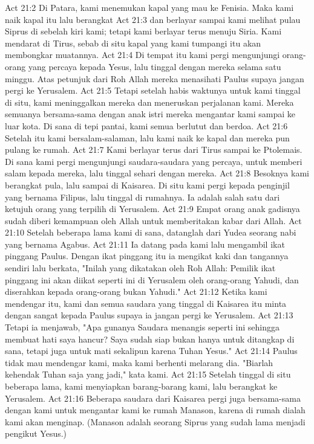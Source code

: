 Act 21:2  Di Patara, kami menemukan kapal yang mau ke Fenisia. Maka kami naik kapal itu lalu berangkat
Act 21:3  dan berlayar sampai kami melihat pulau Siprus di sebelah kiri kami; tetapi kami berlayar terus menuju Siria. Kami mendarat di Tirus, sebab di situ kapal yang kami tumpangi itu akan membongkar muatannya.
Act 21:4  Di tempat itu kami pergi mengunjungi orang-orang yang percaya kepada Yesus, lalu tinggal dengan mereka selama satu minggu. Atas petunjuk dari Roh Allah mereka menasihati Paulus supaya jangan pergi ke Yerusalem.
Act 21:5  Tetapi setelah habis waktunya untuk kami tinggal di situ, kami meninggalkan mereka dan meneruskan perjalanan kami. Mereka semuanya bersama-sama dengan anak istri mereka mengantar kami sampai ke luar kota. Di sana di tepi pantai, kami semua berlutut dan berdoa.
Act 21:6  Setelah itu kami bersalam-salaman, lalu kami naik ke kapal dan mereka pun pulang ke rumah.
Act 21:7  Kami berlayar terus dari Tirus sampai ke Ptolemais. Di sana kami pergi mengunjungi saudara-saudara yang percaya, untuk memberi salam kepada mereka, lalu tinggal sehari dengan mereka.
Act 21:8  Besoknya kami berangkat pula, lalu sampai di Kaisarea. Di situ kami pergi kepada penginjil yang bernama Filipus, lalu tinggal di rumahnya. Ia adalah salah satu dari ketujuh orang yang terpilih di Yerusalem.
Act 21:9  Empat orang anak gadisnya sudah diberi kemampuan oleh Allah untuk memberitakan kabar dari Allah.
Act 21:10  Setelah beberapa lama kami di sana, datanglah dari Yudea seorang nabi yang bernama Agabus.
Act 21:11  Ia datang pada kami lalu mengambil ikat pinggang Paulus. Dengan ikat pinggang itu ia mengikat kaki dan tangannya sendiri lalu berkata, "Inilah yang dikatakan oleh Roh Allah: Pemilik ikat pinggang ini akan diikat seperti ini di Yerusalem oleh orang-orang Yahudi, dan diserahkan kepada orang-orang bukan Yahudi."
Act 21:12  Ketika kami mendengar itu, kami dan semua saudara yang tinggal di Kaisarea itu minta dengan sangat kepada Paulus supaya ia jangan pergi ke Yerusalem.
Act 21:13  Tetapi ia menjawab, "Apa gunanya Saudara menangis seperti ini sehingga membuat hati saya hancur? Saya sudah siap bukan hanya untuk ditangkap di sana, tetapi juga untuk mati sekalipun karena Tuhan Yesus."
Act 21:14  Paulus tidak mau mendengar kami, maka kami berhenti melarang dia. "Biarlah kehendak Tuhan saja yang jadi," kata kami.
Act 21:15  Setelah tinggal di situ beberapa lama, kami menyiapkan barang-barang kami, lalu berangkat ke Yerusalem.
Act 21:16  Beberapa saudara dari Kaisarea pergi juga bersama-sama dengan kami untuk mengantar kami ke rumah Manason, karena di rumah dialah kami akan menginap. (Manason adalah seorang Siprus yang sudah lama menjadi pengikut Yesus.)
